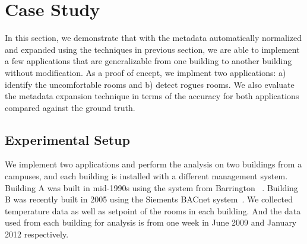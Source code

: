 \section{Case Study}
In this section, we demonstrate that with the metadata automatically normalized and expanded using the techniques in previous section, we are able to implement a few applications that are generalizable from one building to another building without modification. As a proof of cncept, we implment two applications: a) identify the uncomfortable rooms and b) detect rogues rooms. We also evaluate the metadata expansion technique in terms of the accuracy for both applications compared against the ground truth. 

\subsection{Experimental Setup}
We implement two applications and perform the analysis on two buildings from a campuses, and each building is installed with a different management system. Building A was built in mid-1990s using the system from Barrington ~\cite{}. Building B was recently built in 2005 using the Siements BACnet system~\cite{}. We collected temperature data as well as setpoint of the rooms in each building. And the data used from each building for analysis is from one week in June 2009 and January 2012 respectively.

